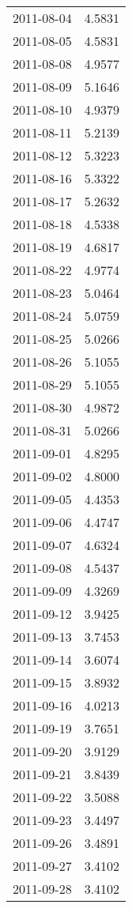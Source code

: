 \begin{tabular}{lr}
2011-08-04 &      4.5831 \\
2011-08-05 &      4.5831 \\
2011-08-08 &      4.9577 \\
2011-08-09 &      5.1646 \\
2011-08-10 &      4.9379 \\
2011-08-11 &      5.2139 \\
2011-08-12 &      5.3223 \\
2011-08-16 &      5.3322 \\
2011-08-17 &      5.2632 \\
2011-08-18 &      4.5338 \\
2011-08-19 &      4.6817 \\
2011-08-22 &      4.9774 \\
2011-08-23 &      5.0464 \\
2011-08-24 &      5.0759 \\
2011-08-25 &      5.0266 \\
2011-08-26 &      5.1055 \\
2011-08-29 &      5.1055 \\
2011-08-30 &      4.9872 \\
2011-08-31 &      5.0266 \\
2011-09-01 &      4.8295 \\
2011-09-02 &      4.8000 \\
2011-09-05 &      4.4353 \\
2011-09-06 &      4.4747 \\
2011-09-07 &      4.6324 \\
2011-09-08 &      4.5437 \\
2011-09-09 &      4.3269 \\
2011-09-12 &      3.9425 \\
2011-09-13 &      3.7453 \\
2011-09-14 &      3.6074 \\
2011-09-15 &      3.8932 \\
2011-09-16 &      4.0213 \\
2011-09-19 &      3.7651 \\
2011-09-20 &      3.9129 \\
2011-09-21 &      3.8439 \\
2011-09-22 &      3.5088 \\
2011-09-23 &      3.4497 \\
2011-09-26 &      3.4891 \\
2011-09-27 &      3.4102 \\
2011-09-28 &      3.4102 \\

\end{tabular}
